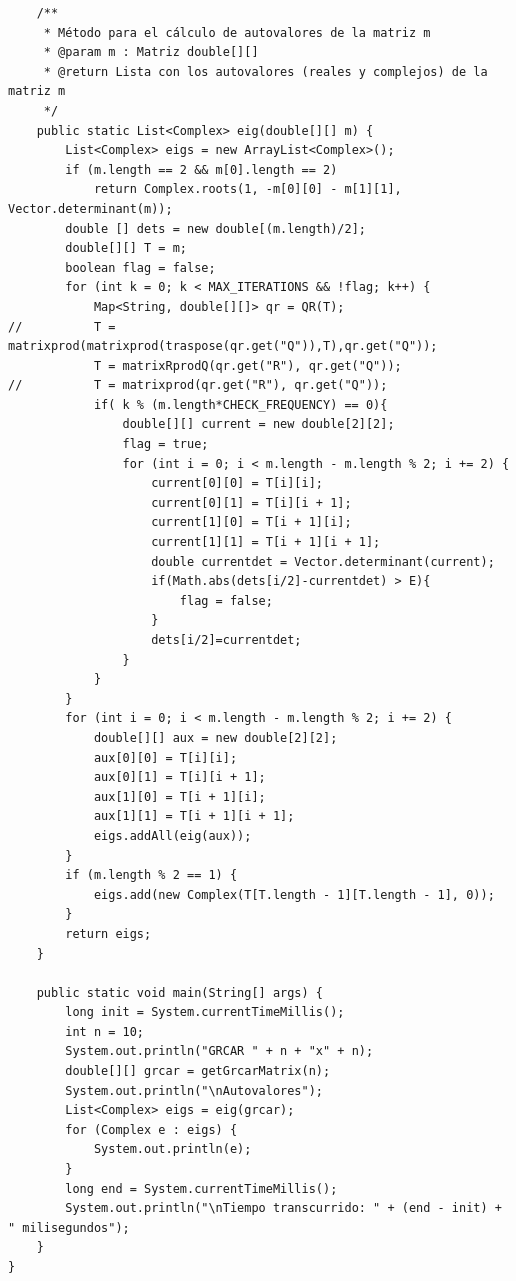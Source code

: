 \documentclass[a4paper,10pt,spanish]{article}
\begin{document}
\begin{verbatim}
	/**
	 * Método para el cálculo de autovalores de la matriz m
	 * @param m : Matriz double[][]
	 * @return Lista con los autovalores (reales y complejos) de la matriz m
	 */
	public static List<Complex> eig(double[][] m) {
		List<Complex> eigs = new ArrayList<Complex>();
		if (m.length == 2 && m[0].length == 2)
			return Complex.roots(1, -m[0][0] - m[1][1], Vector.determinant(m));
		double [] dets = new double[(m.length)/2];
		double[][] T = m;
		boolean flag = false;
		for (int k = 0; k < MAX_ITERATIONS && !flag; k++) {
			Map<String, double[][]> qr = QR(T);
//			T = matrixprod(matrixprod(traspose(qr.get("Q")),T),qr.get("Q"));
			T = matrixRprodQ(qr.get("R"), qr.get("Q"));
//			T = matrixprod(qr.get("R"), qr.get("Q"));
			if( k % (m.length*CHECK_FREQUENCY) == 0){
				double[][] current = new double[2][2];
				flag = true;
				for (int i = 0; i < m.length - m.length % 2; i += 2) {
					current[0][0] = T[i][i];
					current[0][1] = T[i][i + 1];
					current[1][0] = T[i + 1][i];
					current[1][1] = T[i + 1][i + 1];
					double currentdet = Vector.determinant(current);
					if(Math.abs(dets[i/2]-currentdet) > E){
						flag = false;
					}
					dets[i/2]=currentdet;
				}
			}
		}
		for (int i = 0; i < m.length - m.length % 2; i += 2) {
			double[][] aux = new double[2][2];
			aux[0][0] = T[i][i];
			aux[0][1] = T[i][i + 1];
			aux[1][0] = T[i + 1][i];
			aux[1][1] = T[i + 1][i + 1];
			eigs.addAll(eig(aux));
		}
		if (m.length % 2 == 1) {
			eigs.add(new Complex(T[T.length - 1][T.length - 1], 0));
		}
		return eigs;
	}

	public static void main(String[] args) {
		long init = System.currentTimeMillis();
		int n = 10;
		System.out.println("GRCAR " + n + "x" + n);
		double[][] grcar = getGrcarMatrix(n);
		System.out.println("\nAutovalores");
		List<Complex> eigs = eig(grcar);
		for (Complex e : eigs) {
			System.out.println(e);
		}
		long end = System.currentTimeMillis();
		System.out.println("\nTiempo transcurrido: " + (end - init) + " milisegundos");
	}
}

\end{verbatim}
\end{document}
